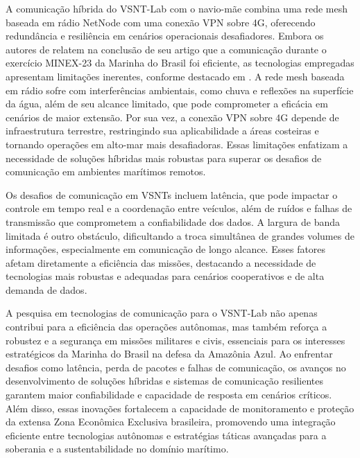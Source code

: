 A comunicação híbrida do VSNT-Lab com o navio-mãe combina uma rede mesh baseada em rádio NetNode com uma conexão VPN sobre 4G, oferecendo redundância e resiliência em cenários operacionais desafiadores. Embora os autores de \cite{VSNT_douglas2024} relatem na conclusão de seu artigo que a comunicação durante o exercício MINEX-23 da Marinha do Brasil foi eficiente, as tecnologias empregadas apresentam limitações inerentes, conforme destacado em \cite{Network_alqurashi2023}. A rede mesh baseada em rádio sofre com interferências ambientais, como chuva e reflexões na superfície da água, além de seu alcance limitado, que pode comprometer a eficácia em cenários de maior extensão. Por sua vez, a conexão VPN sobre 4G depende de infraestrutura terrestre, restringindo sua aplicabilidade a áreas costeiras e tornando operações em alto-mar mais desafiadoras. Essas limitações enfatizam a necessidade de soluções híbridas mais robustas para superar os desafios de comunicação em ambientes marítimos remotos.

Os desafios de comunicação em VSNTs incluem latência, que pode impactar o controle em tempo real e a coordenação entre veículos, além de ruídos e falhas de transmissão que comprometem a confiabilidade dos dados. A largura de banda limitada é outro obstáculo, dificultando a troca simultânea de grandes volumes de informações, especialmente em comunicação de longo alcance. Esses fatores afetam diretamente a eficiência das missões, destacando a necessidade de tecnologias mais robustas e adequadas para cenários cooperativos e de alta demanda de dados\cite{VSNT_ge2018}.

A pesquisa em tecnologias de comunicação para o VSNT-Lab não apenas contribui para a eficiência das operações autônomas, mas também reforça a robustez e a segurança em missões militares e civis, essenciais para os interesses estratégicos da Marinha do Brasil na defesa da Amazônia Azul. Ao enfrentar desafios como latência, perda de pacotes e falhas de comunicação, os avanços no desenvolvimento de soluções híbridas e sistemas de comunicação resilientes garantem maior confiabilidade e capacidade de resposta em cenários críticos. Além disso, essas inovações fortalecem a capacidade de monitoramento e proteção da extensa Zona Econômica Exclusiva brasileira, promovendo uma integração eficiente entre tecnologias autônomas e estratégias táticas avançadas para a soberania e a sustentabilidade no domínio marítimo.